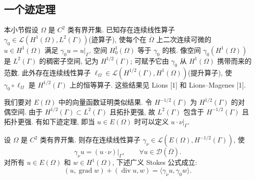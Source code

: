 \subsection{一个迹定理}
\label{subsec:ch1-trace-theorem}

本小节假设 $\Omega$ 是 $C^2$ 类有界开集. 已知存在连续线性算子 $\gamma_0\in\mathcal L(H^1(\Omega),L^2(\Gamma))$(迹算子), 使每个在 $\overline\Omega$ 上二次连续可微的 $u\in H^1(\Omega)$ 满足 $\gamma_0u=u|_\Gamma$. 空间 $H_0^1(\Omega)$ 等于 $\gamma_0$ 的核. 像空间 $\gamma_0(H^1(\Omega))$ 是 $L^2(\Gamma)$ 的稠密子空间, 记为 $H^{1/2}(\Gamma)$; 可赋予它由 $\gamma_0$ 从 $H^1(\Omega)$ 携带而来的范数. 此外存在连续线性算子 $\ell_\Omega\in\mathcal L(H^{1/2}(\Gamma),H^1(\Omega))$(提升算子), 使 $\gamma_0\circ\ell_\Omega$ 是 $H^{1/2}(\Gamma)$ 上的恒等算子. 这些结果见 Lions [1] 和 Lions--Magenes [1].

我们要对 $E(\Omega)$ 中的向量函数证明类似结果. 令 $H^{-1/2}(\Gamma)$ 为 $H^{1/2}(\Gamma)$ 的对偶空间. 由于 $H^{1/2}(\Gamma)\subset L^2(\Gamma)$ 且拓扑更强, 故 $L^2(\Gamma)$ 包含于 $H^{-1/2}(\Gamma)$ 且拓扑更强. 有如下迹定理, 即当 $u\in E(\Omega)$ 时可以定义 $u\cdot\nu|_\Gamma$.

\begin{Theorem}
\label{thm:ch1-normal-trace}
设 $\Omega$ 是 $C^2$ 类有界开集. 则存在连续线性算子 $\gamma_\nu\in\mathcal L(E(\Omega),H^{-1/2}(\Gamma))$, 使
\begin{equation}
\gamma_\nu u=(u\cdot\nu)|_\Gamma,
\qquad\forall u\in\mathbf{\mathcal D}(\overline\Omega).
\label{eq:ch1-normal-trace-smooth}
\end{equation}
对所有 $u\in E(\Omega)$ 和 $w\in H^1(\Omega)$, 下述广义 Stokes 公式成立:
\begin{equation}
(u,\operatorname{grad}w)+(\operatorname{div}u,w)
=\langle\gamma_\nu u,\gamma_0w\rangle.
\label{eq:ch1-generalized-stokes-formula}
\end{equation}
\end{Theorem}

